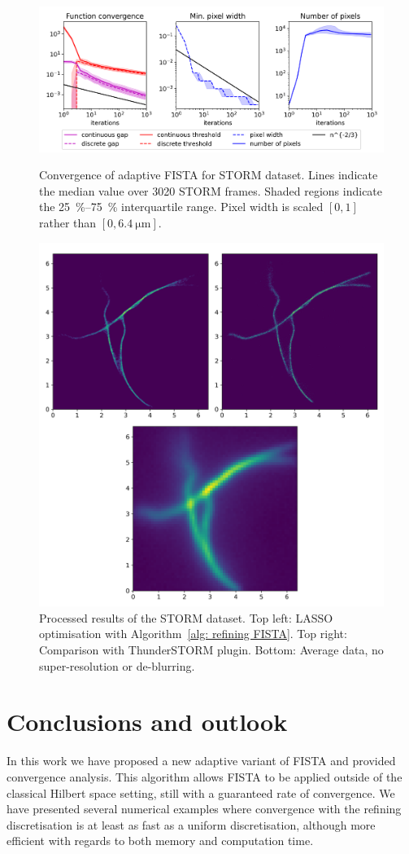 \documentclass[smallextended]{svjour3}
\newcommand{\1}{\F{1}}
\begin{document}
	\begin{figure}\centering
		\includegraphics[width=.82\textwidth]{lasso2_convergence}
		\caption{Convergence of adaptive FISTA for STORM dataset. Lines indicate the median value over 3020 STORM frames. Shaded regions indicate the \SIrange{25}{75}{\percent} interquartile range. Pixel width is scaled $[0,1]$ rather than $[0,\SI{6.4}{\micro\meter}]$.}\label{fig: STORM convergence}
		
		\vspace*{\floatsep}
		
		\includegraphics[width=.73\textwidth]{STORM_recon}
		\caption{Processed results of the STORM dataset. Top left: LASSO optimisation with Algorithm~\ref{alg: refining FISTA}. Top right: Comparison with ThunderSTORM plugin. Bottom: Average data, no super-resolution or de-blurring.}\label{fig: STORM results}
	\end{figure}
	
	\section{Conclusions and outlook}
	In this work we have proposed a new adaptive variant of FISTA and provided convergence analysis. This algorithm allows FISTA to be applied outside of the classical Hilbert space setting, still with a guaranteed rate of convergence. We have presented several numerical examples where convergence with the refining discretisation is at least as fast as a uniform discretisation, although more efficient with regards to both memory and computation time. 
	
\end{document}
